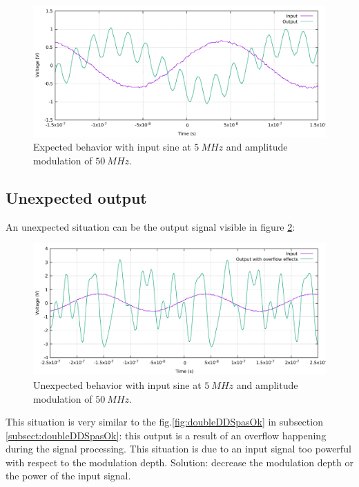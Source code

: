 \documentclass[12pt,oneside]{article}
\begin{document}
\begin{figure}[!h!tb]
	\begin{center}
		\includegraphics[width=14cm]{scope/Mod_amplOk.pdf}
		\caption{Expected behavior with input sine at $5~MHz$ and amplitude modulation of $50~MHz$.}
		\label{fig:ampleModOK}
	\end{center}
\end{figure}

\subsection{Unexpected output}

An unexpected situation can be the output signal visible in figure \ref{fig:ampleModPasOK}: 

\begin{figure}[!h!tb]
	\begin{center}
		\includegraphics[width=14cm]{scope/Mod_amplPasOk.pdf}
		\caption{Unexpected behavior with input sine at $5~MHz$ and amplitude modulation of $50~MHz$.}
		\label{fig:ampleModPasOK}
	\end{center}
\end{figure}

This situation is very similar to the fig.\ref{fig:doubleDDSpasOk} in subsection \ref{subsect:doubleDDSpasOk}: this output is a result of an overflow happening during the signal processing. This situation is due to an input signal too powerful with respect to the modulation depth.
Solution: decrease the modulation depth or the power of the input signal. 
\end{document}
